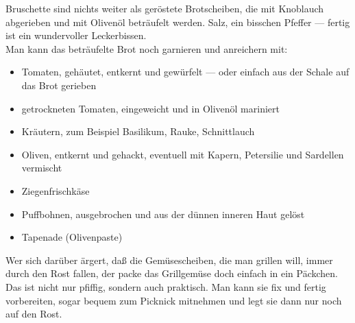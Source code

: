 
      \begin{zubereitung}
        Bruschette sind nichts weiter als geröstete Brotscheiben, die mit
	Knoblauch abgerieben und mit Olivenöl beträufelt werden. Salz, ein
	bisschen Pfeffer --- fertig ist ein wundervoller Leckerbissen. \\
	Man kann das beträufelte Brot noch garnieren und anreichern mit: \\
	\begin{itemize}
	  \item Tomaten, gehäutet, entkernt und gewürfelt --- oder einfach aus
	        der Schale auf das Brot gerieben
          \item getrockneten Tomaten, eingeweicht und in Olivenöl mariniert
	  \item Kräutern, zum Beispiel Basilikum, Rauke, Schnittlauch
	  \item Oliven, entkernt und gehackt, eventuell mit Kapern, Petersilie
	        und Sardellen vermischt
	  \item Ziegenfrischkäse
	  \item Puffbohnen, ausgebrochen und aus der dünnen inneren Haut
	        gelöst
	  \item Tapenade (Olivenpaste)
	\end{itemize}
      \end{zubereitung}

      
      \begin{einleitung}
        Wer sich darüber ärgert, daß die Gemüsescheiben, die man grillen will,
        immer durch den Rost fallen, der packe das Grillgemüse doch einfach in
        ein Päckchen. Das ist nicht nur pfiffig, sondern auch praktisch. Man
	kann sie fix und fertig vorbereiten, sogar bequem zum Picknick
	mitnehmen und legt sie dann nur noch auf den Rost. \\
      \end{einleitung}

